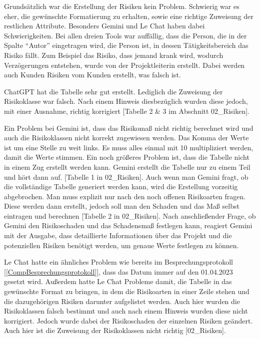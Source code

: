 Grundsätzlich war die Erstellung der Risiken kein Problem. Schwierig war es eher, die gewünschte Formatierung zu erhalten, 
sowie eine richtige Zuweisung der restlichen Attribute. Besonders Gemini und Le Chat haben dabei Schwierigkeiten.
Bei allen dreien Tools war auffällig, dass die Person, die in der Spalte ``Autor'' eingetragen wird, die Person ist, in dessen
Tätigkeitsbereich das Risiko fällt. Zum Beispiel das Risiko, dass jemand krank wird, wodurch Verzögerungen entstehen, wurde von 
der Projektleiterin erstellt. Dabei werden auch Kunden Risiken vom Kunden erstellt, was falsch ist.

ChatGPT hat die Tabelle sehr gut erstellt. Lediglich die Zuweisung der Risikoklasse war falsch. Nach einem Hinweis 
diesbezüglich wurden diese jedoch, mit einer Ausnahme, richtig korrigiert [Tabelle 2 \& 3 im Abschnitt 02\_Risiken].

Ein Problem bei Gemini ist, dass das Risikomaß nicht richtig berechnet wird und auch die Risikoklassen nicht korrekt 
zugewiesen werden. Das Komma der Werte ist um eine Stelle zu weit links. Es muss alles einmal mit 10 multipliziert werden, damit die 
Werte stimmen. Ein noch größeres Problem ist, dass die Tabelle nicht in einem Zug erstellt werden kann. Gemini erstellt die Tabelle nur zu einem 
Teil und hört dann auf. [Tabelle 1 in 02\_Risiken]. Auch wenn man Gemini fragt, ob die vollständige Tabelle generiert werden kann, wird 
die Erstellung vorzeitig abgebrochen. Man muss explizit nur nach den noch offenen Risikoarten fragen. Diese werden dann erstellt, jedoch soll man 
den Schaden und das Maß selbst eintragen und berechnen [Tabelle 2 in 02\_Risiken]. Nach anschließender Frage, ob Gemini den Risikoschaden und das Schadensmaß 
festlegen kann, reagiert Gemini mit der Ausgabe, dass detaillierte Informationen über das Projekt und die potenziellen Risiken benötigt werden, 
um genaue Werte festlegen zu können.

Le Chat hatte ein ähnliches Problem wie bereits im Besprechungsprotokoll [\autoref{CompBesprechungsprotokoll}], dass das 
Datum immer auf den 01.04.2023 gesetzt wird. Außerdem hatte Le Chat Probleme damit, die Tabelle in das gewünschte Format
zu bringen, in dem die Risikoarten in einer Zeile stehen und die dazugehörigen Risiken darunter aufgelistet werden. Auch 
hier wurden die Risikoklassen falsch bestimmt und auch nach einem Hinweis wurden diese nicht korrigiert. Jedoch wurde 
dabei der Risikoschaden der einzelnen Risiken geändert. Auch hier ist die Zuweisung der Risikoklassen nicht richtig [02\_Risiken].

